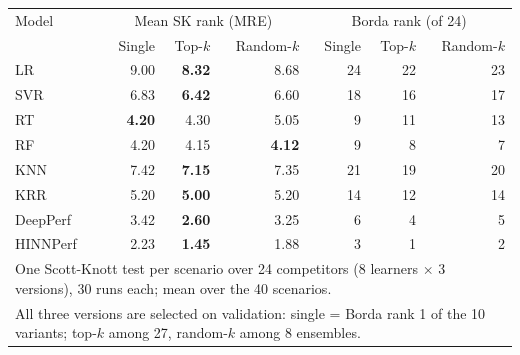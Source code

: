 \begin{tabular}{lrrrrrr}
\toprule
Model & \multicolumn{3}{c}{Mean SK rank (MRE)} & \multicolumn{3}{c}{Borda rank (of 24)} \\
 & Single & Top-$k$ & Random-$k$ & Single & Top-$k$ & Random-$k$ \\
\midrule
LR & 9.00 & \textbf{8.32} & 8.68 & 24 & 22 & 23 \\
SVR & 6.83 & \textbf{6.42} & 6.60 & 18 & 16 & 17 \\
RT & \textbf{4.20} & 4.30 & 5.05 & 9 & 11 & 13 \\
RF & 4.20 & 4.15 & \textbf{4.12} & 9 & 8 & 7 \\
KNN & 7.42 & \textbf{7.15} & 7.35 & 21 & 19 & 20 \\
KRR & 5.20 & \textbf{5.00} & 5.20 & 14 & 12 & 14 \\
DeepPerf & 3.42 & \textbf{2.60} & 3.25 & 6 & 4 & 5 \\
HINNPerf & 2.23 & \textbf{1.45} & 1.88 & 3 & 1 & 2 \\
\bottomrule
\multicolumn{7}{l}{One Scott-Knott test per scenario over 24 competitors (8 learners $\times$ 3 versions), 30 runs each; mean over the 40 scenarios.} \\
\multicolumn{7}{l}{All three versions are selected on validation: single = Borda rank 1 of the 10 variants; top-$k$ among 27, random-$k$ among 8 ensembles.} \\
\end{tabular}
